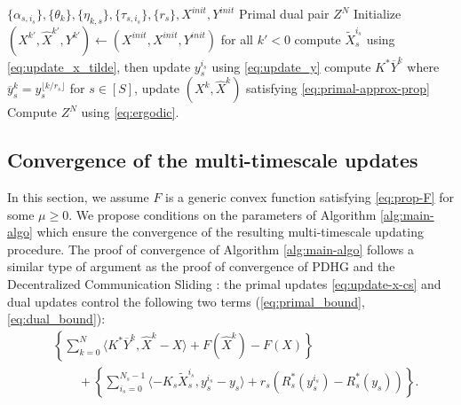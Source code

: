 \documentclass[10pt]{article}
\begin{document}
\begin{algorithm}
\caption{(Accelerated) Multi-timescale PDHG}\label{alg:main-algo}
\begin{algorithmic}
\Require $\{\alpha_{s,i_s}\},\{\theta_k\},\{\eta_{k,s}\},\{\tau_{s,i_s}\},\{r_s\},X^{init},Y^{init}$
\Ensure Primal dual pair $Z^N$
\State Initialize $(X^{k'},\widehat{X}^{k'},Y^{k'})\gets (X^{init},X^{init},Y^{init})$ for all $k'< 0$
\State {\color{blue}{Dual update:}} compute $\widetilde{X}_{s}^{i_s}$ using \eqref{eq:update_x_tilde}, then update $y_s^{i_s}$ using \eqref{eq:update_y}
\EndFor
\State {\color{red}{Primal update:}} compute $K^*\overline{Y}^k$ where $\overline{y}_s^k = y_s^{\lfloor k/r_s\rfloor}$ for $s\in [S]$, update $(X^k,\widehat{X}^k)$ satisfying \eqref{eq:primal-approx-prop} 
\EndFor 
\State Compute $Z^N$ using \eqref{eq:ergodic}. 
\end{algorithmic}
\end{algorithm}




\subsection{Convergence of the multi-timescale updates}\label{sec:convergence-convex}
In this section, we assume $F$ is a generic convex function satisfying \eqref{eq:prop-F} for some $\mu\geq 0$. We propose conditions on the parameters of  Algorithm \ref{alg:main-algo} which ensure the convergence of the resulting multi-timescale updating procedure. 
The proof of convergence of Algorithm \ref{alg:main-algo} follows a similar type of argument as the proof of convergence of PDHG \cite{chambolle_first-order_2011} and the Decentralized Communication Sliding \cite{lan_communication-efficient_2020}: the primal updates \eqref{eq:update-x-cs} and dual updates control the following two terms (\eqref{eq:primal_bound}, \eqref{eq:dual_bound}): 
\begin{align*}
    &\left\{\sum_{k=0}^N \langle K^*\overline{Y}^k,\widehat{X}^k - X\rangle +F(\widehat{X}^k) - F(X)\right\} \\
    &\qquad+ \left\{ \sum_{i_s=0}^{N_s-1}\langle -K_{s}\widetilde{X}_s^{i_s},y_s^{i_s} - y_s\rangle + r_s(R^*_s(y_s^{i_s}) - R^*_s(y_s))\right\}. 
\end{align*}
\end{document}
